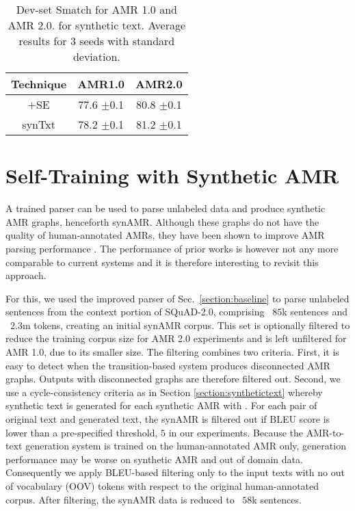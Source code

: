 \documentclass[11pt,a4paper]{article}
\begin{document}
\begin{table}[h]
    \centering
    \fontsize{10pt}{12pt}\selectfont
    \setlength{\tabcolsep}{2.0pt}
    \begin{tabular}{c | c | c }
        Technique&{AMR1.0}&{AMR2.0}\\
        \hline
        \cite{anon2020a}$+$SE & 77.6 \footnotesize{$\pm$0.1} &  80.8 \footnotesize{$\pm$0.1}\\
        \hline
        synTxt     & 78.2 \footnotesize{$\pm$0.1} & 81.2 \footnotesize{$\pm$0.1}\\
        \hline
    \end{tabular}
    \caption{Dev-set Smatch for AMR 1.0 and AMR 2.0. for synthetic text. Average results for $3$ seeds with standard deviation.}
    \label{tab:syntext}
\end{table}
 
\section{Self-Training with Synthetic AMR}
\label{section:syntheticamr}
A trained parser can be used to parse unlabeled data and produce synthetic AMR graphs, henceforth synAMR. Although these graphs do not have the quality of human-annotated AMRs, they have been shown to improve AMR parsing performance \cite{konstas2017neural,noordbos2017amr}. The performance of prior works is however not any more comparable to current systems and it is therefore interesting to revisit this approach.







For this, we used the improved \cite{anon2020a} parser of Sec.~\ref{section:baseline} to parse unlabeled sentences from the context portion of SQuAD-2.0, comprising ~$85$k sentences and ~$2.3$m tokens, creating an initial synAMR corpus. This set is optionally filtered to reduce the training corpus size for AMR 2.0 experiments and is left unfiltered for AMR 1.0, due to its smaller size. The filtering combines two criteria. First, it is easy to detect when the transition-based system produces disconnected AMR graphs. Outputs with disconnected graphs are therefore filtered out. Second, we use a cycle-consistency criteria as in Section \ref{section:synthetictext} whereby synthetic text is generated for each synthetic AMR with \cite{mager-etal-2020-gpt-too}. For each pair of original text and generated text, the synAMR is filtered out if BLEU score \cite{papineni2002bleu} is lower than a pre-specified threshold, $5$ in our experiments. Because the AMR-to-text generation system is trained on the human-annotated AMR only, generation performance may be worse on synthetic AMR and out of domain data. Consequently we apply BLEU-based filtering only to the input texts with no out of vocabulary (OOV) tokens with respect to the original human-annotated corpus. After filtering, the synAMR data is reduced to ~$58$k sentences. 
\end{document}

